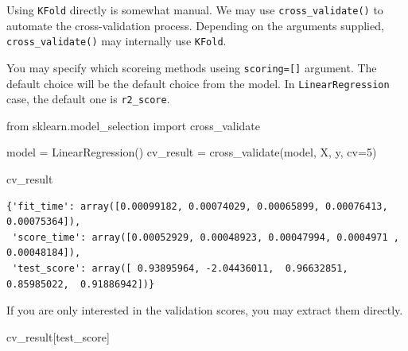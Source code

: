 \documentclass[
  letterpaper,
  DIV=11,
  numbers=noendperiod]{scrreprt}
\newenvironment{Shaded}{\begin{snugshade}}{\end{snugshade}}
\newcommand{\DecValTok}[1]{\textcolor[rgb]{0.68,0.00,0.00}{#1}}
\newcommand{\ImportTok}[1]{\textcolor[rgb]{0.00,0.46,0.62}{#1}}
\newcommand{\NormalTok}[1]{\textcolor[rgb]{0.00,0.23,0.31}{#1}}
\newcommand{\OperatorTok}[1]{\textcolor[rgb]{0.37,0.37,0.37}{#1}}
\newcommand{\StringTok}[1]{\textcolor[rgb]{0.13,0.47,0.30}{#1}}
\theoremstyle{definition}
\theoremstyle{definition}
\theoremstyle{plain}
\theoremstyle{plain}
\theoremstyle{remark}
\begin{document}
\begin{tcolorbox}[enhanced jigsaw, arc=.35mm, bottomrule=.15mm, bottomtitle=1mm, breakable, colback=white, colbacktitle=quarto-callout-note-color!10!white, colframe=quarto-callout-note-color-frame, coltitle=black, left=2mm, leftrule=.75mm, opacityback=0, opacitybacktitle=0.6, rightrule=.15mm, title=\textcolor{quarto-callout-note-color}{\faInfo}\hspace{0.5em}{\texttt{cross\_validate}}, titlerule=0mm, toprule=.15mm, toptitle=1mm]

Using \texttt{KFold} directly is somewhat manual. We may use
\texttt{cross\_validate()} to automate the cross-validation process.
Depending on the arguments supplied, \texttt{cross\_validate()} may
internally use \texttt{KFold}.

You may specify which scoreing methods useing \texttt{scoring={[}{]}}
argument. The default choice will be the default choice from the model.
In \texttt{LinearRegression} case, the default one is
\texttt{r2\_score}.

\begin{Shaded}
\begin{Highlighting}[]
\ImportTok{from}\NormalTok{ sklearn.model\_selection }\ImportTok{import}\NormalTok{ cross\_validate}

\NormalTok{model }\OperatorTok{=}\NormalTok{ LinearRegression()}
\NormalTok{cv\_result }\OperatorTok{=}\NormalTok{ cross\_validate(model, X, y, cv}\OperatorTok{=}\DecValTok{5}\NormalTok{)}

\NormalTok{cv\_result}
\end{Highlighting}
\end{Shaded}

\begin{verbatim}
{'fit_time': array([0.00099182, 0.00074029, 0.00065899, 0.00076413, 0.00075364]),
 'score_time': array([0.00052929, 0.00048923, 0.00047994, 0.0004971 , 0.00048184]),
 'test_score': array([ 0.93895964, -2.04436011,  0.96632851,  0.85985022,  0.91886942])}
\end{verbatim}

If you are only interested in the validation scores, you may extract
them directly.

\begin{Shaded}
\begin{Highlighting}[]
\NormalTok{cv\_result[}\StringTok{\textquotesingle{}test\_score\textquotesingle{}}\NormalTok{]}
\end{Highlighting}
\end{Shaded}


\end{tcolorbox}
\end{document}
